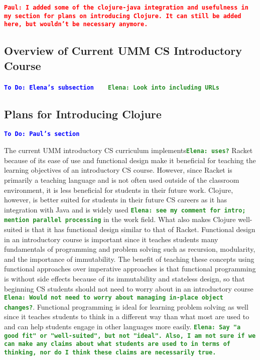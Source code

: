 \documentclass[12pt]{article}
\newcommand{\comment}[1]{{\bf \tt  {#1}}}
\newcommand{\emcomment}[1]{\textcolor{ForestGreen}{\comment{Elena: {#1}}}}
\newcommand{\todo}[1]{\textcolor{blue}{\comment{To Do: {#1}}}}
\newcommand{\pscomment}[1]{\textcolor{red}{\comment{Paul: {#1}}}}
\begin{document}
\pscomment{I added some of the clojure-java integration and usefulness in my section for plans on introducing Clojure.  It can still be added here, but wouldn't be necessary anymore.}

\subsection{Overview of Current UMM CS Introductory Course}\label{subsec:course}
\todo{Elena's subsection}
~\cite{htdp}
~\cite{lein} \emcomment{Look into including URLs}

\subsection{Plans for Introducing Clojure}\label{subsec:plans}
\todo{Paul's section}

The current UMM introductory CS curriculum implements\emcomment{uses?} Racket because of its ease of use and functional design make it beneficial for teaching the learning objectives of an introductory CS course.  However, since Racket is primarily a teaching language and is not often used outside of the classroom environment, it is less beneficial for students in their future work. Clojure, however, is better suited for students in their future CS careers as it has integration with Java and is widely used \emcomment{see my comment for intro; mention parallel processing} in the work field. What also makes Clojure well-suited is that it has functional design similar to that of  Racket. Functional design in an introductory course is important since it teaches students many fundamentals of programming and problem solving such as recursion, modularity, and the importance of immutability. The benefit of teaching these concepts using functional approaches over imperative approaches is that functional programming is without side effects because of its immutability and stateless design, so that beginning CS students should not need to worry about in an introductory course \emcomment{Would not need to worry about managing in-place object changes?}. Functional programming is ideal for learning problem solving as well since it teaches students to think in a different way than what most are used to and can help students engage in other languages more easily. \emcomment{Say "a good fit" or "well-suited", but not "ideal". Also, I am not sure if we can make any claims about what students are used to in terms of thinking, nor do I think these claims are necessarily true.}
\end{document}
